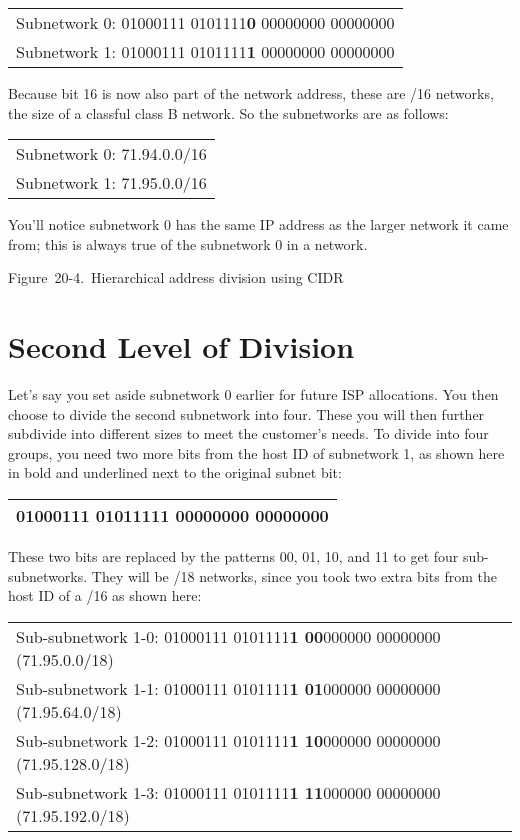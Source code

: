 \begin{longtable}[]{@{}l@{}}
\toprule
\endhead
Subnetwork 0: 01000111 0101111{\textbf{0}} 00000000
00000000\tabularnewline
Subnetwork 1: 01000111 0101111{\textbf{1}} 00000000
00000000\tabularnewline
\bottomrule
\end{longtable}

Because bit 16 is now also part of the network address, these are /16
networks, the size of a classful class B network. So the subnetworks are
as follows:

\begin{longtable}[]{@{}l@{}}
\toprule
\endhead
Subnetwork 0: 71.94.0.0/16\tabularnewline
Subnetwork 1: 71.95.0.0/16\tabularnewline
\bottomrule
\end{longtable}

You'll notice subnetwork 0 has the same IP address as the larger network
it came from; this is always true of the subnetwork 0 in a network.

\protect\hypertarget{ch20s04.htmlux5cux23hierarchical_address_division_using_cidr}{}{}

\protect\hypertarget{ch20s04.htmlux5cux23I_mediaobject6_d1e22510}{}{}

Figure~20-4.~Hierarchical address division using CIDR

\section{Second Level of Division}

Let's say you set aside subnetwork 0 earlier for future ISP allocations.
You then choose to divide the second subnetwork into four. These you
will then further subdivide into different sizes to meet the customer's
needs. To divide into four groups, you need two more bits from the host
ID of subnetwork 1, as shown here in bold and underlined next to the
original subnet bit:

\begin{longtable}[]{@{}l@{}}
\toprule
\endhead
01000111 0101111{\textbf{1 {00}}}000000 00000000\tabularnewline
\bottomrule
\end{longtable}

These two bits are replaced by the patterns 00, 01, 10, and 11 to get
four sub-subnetworks. They will be /18 networks, since you took two
extra bits from the host ID of a /16 as shown here:

\begin{longtable}[]{@{}l@{}}
\toprule
\endhead
Sub-subnetwork 1-0: 01000111 0101111{\textbf{1 {00}}}000000 00000000
(71.95.0.0/18)\tabularnewline
Sub-subnetwork 1-1: 01000111 0101111{\textbf{1 {01}}}000000 00000000
(71.95.64.0/18)\tabularnewline
Sub-subnetwork 1-2: 01000111 0101111{\textbf{1 {10}}}000000 00000000
(71.95.128.0/18)\tabularnewline
Sub-subnetwork 1-3: 01000111 0101111{\textbf{1 {11}}}000000 00000000
(71.95.192.0/18)\tabularnewline
\bottomrule
\end{longtable}

